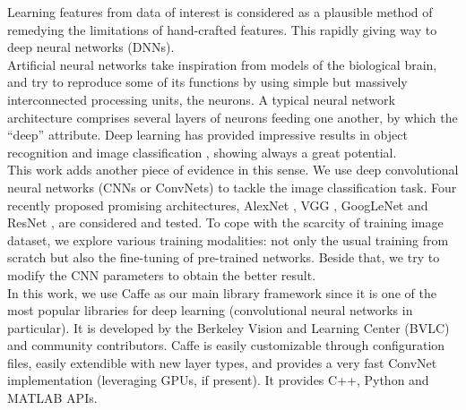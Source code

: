 \documentclass[hidelinks,12pt,a4paper]{report}
\begin{document}
Learning features from data of interest is considered as a plausible method of remedying the limitations of hand-crafted features. This rapidly giving way to deep neural networks (DNNs).\\

Artificial neural networks take inspiration from models of the biological brain, and try to reproduce some of its functions by using simple but massively interconnected processing units, the neurons. A typical neural network architecture comprises several layers of neurons feeding one another, by which the ``deep'' attribute. Deep learning has provided impressive results in object recognition and image classification \cite{Krizhevsky:2017:ICD:3098997.3065386} \cite{DBLP:journals/corr/SzegedyLJSRAEVR14} \cite{DBLP:journals/corr/SzegedyVISW15} \cite{DBLP:journals/corr/HeZRS15}, showing always a great potential.\\

This work adds another piece of evidence in this sense. We use deep convolutional neural networks (CNNs or ConvNets) to tackle the image classification task. Four recently proposed promising architectures, AlexNet \cite{Krizhevsky:2017:ICD:3098997.3065386},  VGG \cite{DBLP:journals/corr/SimonyanZ14a}, GoogLeNet \cite{DBLP:journals/corr/SzegedyLJSRAEVR14} and ResNet \cite{DBLP:journals/corr/HeZRS15}, are considered and tested. To cope with the scarcity of training image dataset, we explore various training modalities: not only the usual training from scratch but
also the fine-tuning of pre-trained networks. Beside that, we try to modify the CNN parameters to obtain the better result.\\

In this work, we use Caffe\cite{jia2014caffe} as our main library framework since it is one of the most popular libraries for deep learning (convolutional neural networks in particular). It is developed by the Berkeley Vision and Learning Center (BVLC) and community contributors. Caffe is easily customizable through configuration files, easily extendible with new layer types, and provides a very fast ConvNet implementation (leveraging GPUs, if present). It provides C++, Python and MATLAB APIs.
\end{document}
